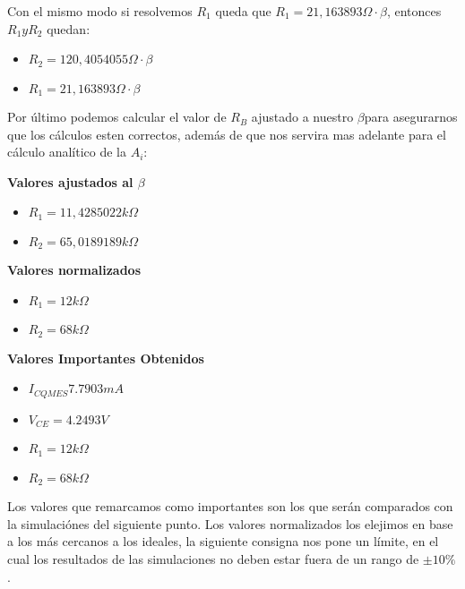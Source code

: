 \begin{multicols}{2}
			\sangria{} Con el mismo modo si resolvemos $R_1$ queda que $R_1=21,163893\Omega \cdot \beta$, entonces $R_1 y R_2$ quedan:
            \begin{itemize}[nosep]
				\item $R_2 = 120,4054055\Omega \cdot \beta$
				\item $R_1 = 21,163893\Omega \cdot \beta$
            \end{itemize}


            \sangria{}Por último podemos calcular el valor de $R_B$ ajustado a nuestro $\beta$para asegurarnos que los cálculos esten correctos, además de que nos servira mas adelante para el cálculo analítico de la $A_i$:



            \textbf{Valores ajustados al $\beta$}
            \begin{itemize}[nosep]
				\item $R_1 = 11,4285022 k\Omega$
				\item $R_2 = 65,0189189 k\Omega$
			\end{itemize}


            \textbf{Valores normalizados}
            \begin{itemize}[nosep]
				\item $R_1 = 12 k\Omega$
				\item $R_2 = 68 k\Omega$
			\end{itemize}

			\textbf{Valores Importantes Obtenidos}
            \begin{itemize}[nosep]
            	\item $I_{CQMES} 7.7903mA $
            	\item $V_{CE} = 4.2493V$
				\item $R_1 = 12 k\Omega$
				\item $R_2 = 68 k\Omega$
			\end{itemize}

			\sangria{}Los valores que remarcamos como importantes son los que serán comparados con la simulaciónes del siguiente punto.
			\sangria{}Los valores normalizados los elejimos en base a los más cercanos a los ideales, la siguiente consigna nos pone un límite, en el cual los resultados de las simulaciones no deben estar fuera de un rango de $\pm 10\%$.


\end{multicols}
